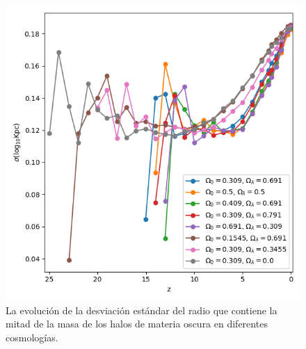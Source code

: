 \documentclass{beamer}
\begin{document}
\begin{frame}
\begin{columns}[t]
			\begin{column}{.5\textwidth}
				\begin{figure}
					\centering
					\includegraphics[scale=0.27]{Conc/HalfMassRad_Std_Conc.png}
					\caption{\footnotesize La evolución de la desviación estándar del radio que contiene la mitad de la masa de los halos de materia oscura en diferentes cosmologías.}
					\label{fig:Conc-HalfMassRadStd}
				\end{figure}
			\end{column}
		\end{columns}

	\end{frame}	

	
\end{document}
